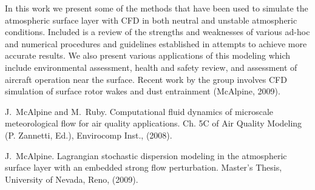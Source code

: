 In this work we present some of the methods that have been used to simulate the atmospheric surface layer with CFD in 
both neutral and unstable atmospheric conditions. Included is a review of the strengths and weaknesses of various ad-hoc 
and numerical procedures and guidelines established in attempts to achieve more accurate results. We also present various 
applications of this modeling which include environmental assessment, health and safety review, and assessment of aircraft 
operation near the surface. Recent work by the group involves CFD simulation of surface rotor wakes and dust entrainment
(McAlpine, 2009). 



\begin{thebibliography}{10}

{\sc J.~McAlpine and M.~Ruby}. {Computational fluid dynamics of microscale meteorological flow for air quality applications}. Ch. 5C of Air
  Quality Modeling (P. Zannetti, Ed.), Envirocomp Inst., (2008).

{\sc J.~McAlpine}. {Lagrangian stochastic dispersion modeling in the atmospheric surface layer with an embedded strong flow perturbation}. Master's Thesis,
 University of Nevada, Reno, (2009).



\end{thebibliography}

